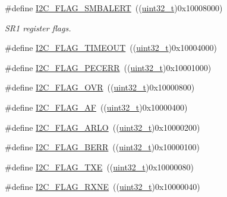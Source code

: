\begin{DoxyCompactItemize}
\item 
\#define \hyperlink{group___i2_c__flags__definition_ga4e1d7cd1574d03ba501c27483300c1be}{I2\+C\+\_\+\+F\+L\+A\+G\+\_\+\+S\+M\+B\+A\+L\+E\+RT}~((\hyperlink{_p_e___types_8h_a33594304e786b158f3fb30289278f5af}{uint32\+\_\+t})0x10008000)
\begin{DoxyCompactList}\small\item\em S\+R1 register flags. \end{DoxyCompactList}\item 
\#define \hyperlink{group___i2_c__flags__definition_ga89c8d5d8ccc77a8619fafe9b39d1cc74}{I2\+C\+\_\+\+F\+L\+A\+G\+\_\+\+T\+I\+M\+E\+O\+UT}~((\hyperlink{_p_e___types_8h_a33594304e786b158f3fb30289278f5af}{uint32\+\_\+t})0x10004000)
\item 
\#define \hyperlink{group___i2_c__flags__definition_ga6c7addb6413f165f42bcc87506ea8467}{I2\+C\+\_\+\+F\+L\+A\+G\+\_\+\+P\+E\+C\+E\+RR}~((\hyperlink{_p_e___types_8h_a33594304e786b158f3fb30289278f5af}{uint32\+\_\+t})0x10001000)
\item 
\#define \hyperlink{group___i2_c__flags__definition_gab579673c8ac920db199aa7f18e547fb3}{I2\+C\+\_\+\+F\+L\+A\+G\+\_\+\+O\+VR}~((\hyperlink{_p_e___types_8h_a33594304e786b158f3fb30289278f5af}{uint32\+\_\+t})0x10000800)
\item 
\#define \hyperlink{group___i2_c__flags__definition_ga2f89dbba9b964e6ade1480705e7a97d4}{I2\+C\+\_\+\+F\+L\+A\+G\+\_\+\+AF}~((\hyperlink{_p_e___types_8h_a33594304e786b158f3fb30289278f5af}{uint32\+\_\+t})0x10000400)
\item 
\#define \hyperlink{group___i2_c__flags__definition_gae1e67936f4780e42b8bbe04ac9c20a7b}{I2\+C\+\_\+\+F\+L\+A\+G\+\_\+\+A\+R\+LO}~((\hyperlink{_p_e___types_8h_a33594304e786b158f3fb30289278f5af}{uint32\+\_\+t})0x10000200)
\item 
\#define \hyperlink{group___i2_c__flags__definition_ga0454176b6ddd5c402abc3ef5953a21ad}{I2\+C\+\_\+\+F\+L\+A\+G\+\_\+\+B\+E\+RR}~((\hyperlink{_p_e___types_8h_a33594304e786b158f3fb30289278f5af}{uint32\+\_\+t})0x10000100)
\item 
\#define \hyperlink{group___i2_c__flags__definition_gaeda14a3e9d02ff20a0d001bba9328f3d}{I2\+C\+\_\+\+F\+L\+A\+G\+\_\+\+T\+XE}~((\hyperlink{_p_e___types_8h_a33594304e786b158f3fb30289278f5af}{uint32\+\_\+t})0x10000080)
\item 
\#define \hyperlink{group___i2_c__flags__definition_gad53c5b70a186f699f187c7a641ab0dac}{I2\+C\+\_\+\+F\+L\+A\+G\+\_\+\+R\+X\+NE}~((\hyperlink{_p_e___types_8h_a33594304e786b158f3fb30289278f5af}{uint32\+\_\+t})0x10000040)

\end{DoxyCompactItemize}
